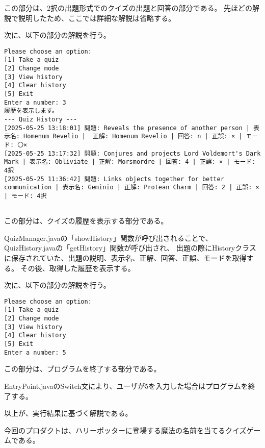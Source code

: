 \documentclass[uplatex,dvipdfmx,a4paper]{jsarticle}
\begin{document}
\par この部分は、2択の出題形式でのクイズの出題と回答の部分である。
先ほどの解説で説明したため、ここでは詳細な解説は省略する。
\par 次に、以下の部分の解説を行う。
\begin{lstlisting}[style=result]
  Please choose an option:
[1] Take a quiz
[2] Change mode
[3] View history
[4] Clear history
[5] Exit
Enter a number: 3
履歴を表示します。
--- Quiz History ---
[2025-05-25 13:18:01] 問題: Reveals the presence of another person | 表示名: Homenum Revelio |  正解: Homenum Revelio | 回答: n | 正誤: × | モード: 〇×
[2025-05-25 13:17:32] 問題: Conjures and projects Lord Voldemort's Dark Mark | 表示名: Obliviate | 正解: Morsmordre | 回答: 4 | 正誤: × | モード: 4択
[2025-05-25 11:36:42] 問題: Links objects together for better communication | 表示名: Geminio | 正解: Protean Charm | 回答: 2 | 正誤: × | モード: 4択


\end{lstlisting}
\par この部分は、クイズの履歴を表示する部分である。
\par QuizManager.javaの「showHistory」関数が呼び出されることで、QuizHistory.javaの「getHistory」関数が呼び出され、
出題の際にHistoryクラスに保存されていた、出題の説明、表示名、正解、回答、正誤、モードを取得する。
その後、取得した履歴を表示する。
\par 次に、以下の部分の解説を行う。

\begin{lstlisting}[style=result]
  Please choose an option:
[1] Take a quiz
[2] Change mode
[3] View history
[4] Clear history
[5] Exit
Enter a number: 5
\end{lstlisting}
\par この部分は、プログラムを終了する部分である。
\par EntryPoint.javaのSwitch文により、ユーザが5を入力した場合はプログラムを終了する。
\par 以上が、実行結果に基づく解説である。
\par 今回のプロダクトは、ハリーポッターに登場する魔法の名前を当てるクイズゲームである。
\end{document}
